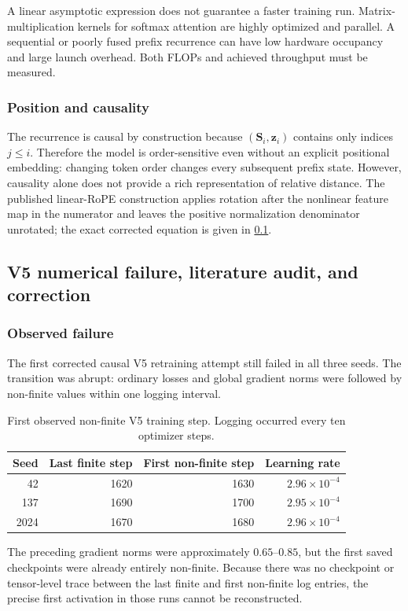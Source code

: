 \documentclass[11pt,a4paper]{article}
\theoremstyle{definition}
\theoremstyle{plain}
\newcommand{\vz}{\bm{z}}
\newcommand{\mS}{\bm{S}}
\begin{document}
\begin{tradeoffbox}
A linear asymptotic expression does not guarantee a faster training run. Matrix-multiplication kernels for softmax attention are highly optimized and parallel. A sequential or poorly fused prefix recurrence can have low hardware occupancy and large launch overhead. Both FLOPs and achieved throughput must be measured.
\end{tradeoffbox}

\subsubsection{Position and causality}

The recurrence is causal by construction because $(\mS_i,\vz_i)$ contains only indices $j\leq i$. Therefore the model is order-sensitive even without an explicit positional embedding: changing token order changes every subsequent prefix state. However, causality alone does not provide a rich representation of relative distance. The published linear-RoPE construction applies rotation after the nonlinear feature map in the numerator and leaves the positive normalization denominator unrotated; the exact corrected equation is given in \cref{sec:v5-failure-correction}.

\subsection{V5 numerical failure, literature audit, and correction}
\label{sec:v5-failure-correction}

\subsubsection{Observed failure}

The first corrected causal V5 retraining attempt still failed in all three seeds. The transition was abrupt: ordinary losses and global gradient norms were followed by non-finite values within one logging interval.
\begin{table}[H]
\centering
\caption{First observed non-finite V5 training step. Logging occurred every ten optimizer steps.}
\label{tab:v5-nan-steps}
\begin{tabular}{@{}rrrr@{}}
\toprule
Seed & Last finite step & First non-finite step & Learning rate \\
\midrule
42   & 1620 & 1630 & $2.96\times10^{-4}$ \\
137  & 1690 & 1700 & $2.95\times10^{-4}$ \\
2024 & 1670 & 1680 & $2.96\times10^{-4}$ \\
\bottomrule
\end{tabular}
\end{table}
The preceding gradient norms were approximately $0.65$--$0.85$, but the first saved checkpoints were already entirely non-finite. Because there was no checkpoint or tensor-level trace between the last finite and first non-finite log entries, the precise first activation in those runs cannot be reconstructed.
\end{document}
